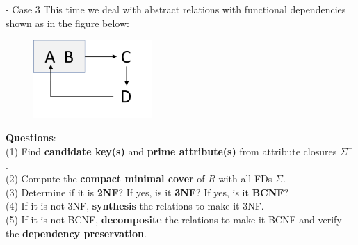 \begin{frame}[fragile]{ - Case 3}
	This time we deal with abstract relations with functional dependencies shown as in the figure below:\\\vspace{-5pt}
	
	\begin{figure}
		\includegraphics[width=0.4\textwidth, trim=0 0 0 0, clip]{t5/images/case3.png}
	\end{figure}\vspace{-10pt}
	
	\textbf{Questions}:\\
	(1) Find \textbf{candidate key(s)} and \textbf{prime attribute(s)} from attribute closures $\Sigma^{+}$.\\
	(2) Compute the \textbf{compact minimal cover} of $R$ with all FDs $\Sigma$.\\
	(3) Determine if it is \textbf{2NF}? If yes, is it \textbf{3NF}? If yes, is it \textbf{BCNF}?\\
	(4) If it is not 3NF, \textbf{synthesis} the relations to make it 3NF.\\
	(5) If it is not BCNF, \textbf{decomposite} the relations to make it BCNF and verify the \textbf{dependency preservation}. 
\end{frame}


